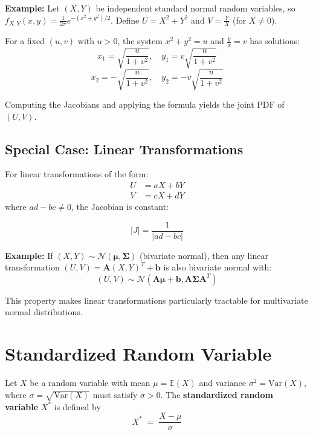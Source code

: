 \documentclass[twoside]{book}
\begin{document}
\vspace{2mm}

\textbf{Example:} Let $(X,Y)$ be independent standard normal random variables, so $f_{X,Y}(x,y) = \frac{1}{2\pi}e^{-(x^2+y^2)/2}$. Define $U = X^2 + Y^2$ and $V = \frac{Y}{X}$ (for $X \neq 0$).

For a fixed $(u,v)$ with $u > 0$, the system $x^2 + y^2 = u$ and $\frac{y}{x} = v$ has solutions:
\[
x_1 = \sqrt{\frac{u}{1+v^2}}, \quad y_1 = v\sqrt{\frac{u}{1+v^2}}
\]
\[
x_2 = -\sqrt{\frac{u}{1+v^2}}, \quad y_2 = -v\sqrt{\frac{u}{1+v^2}}
\]

Computing the Jacobians and applying the formula yields the joint PDF of $(U,V)$.

\subsection{Special Case: Linear Transformations}

For linear transformations of the form:
\begin{align}
U &= aX + bY \\
V &= cX + dY
\end{align}
where $ad - bc \neq 0$, the Jacobian is constant:

\begin{textbox}
\[
|J| = \frac{1}{|ad - bc|}
\]
\end{textbox}

\vspace{2mm}

\textbf{Example:} If $(X,Y) \sim \mathcal{N}(\boldsymbol{\mu}, \boldsymbol{\Sigma})$ (bivariate normal), then any linear transformation $(U,V) = \mathbf{A}(X,Y)^T + \mathbf{b}$ is also bivariate normal with:
\[
(U,V) \sim \mathcal{N}(\mathbf{A}\boldsymbol{\mu} + \mathbf{b}, \mathbf{A}\boldsymbol{\Sigma}\mathbf{A}^T)
\]

This property makes linear transformations particularly tractable for multivariate normal distributions.


\section{Standardized Random Variable}

Let \(X\) be a random variable with mean \(\mu = \mathbb{E}(X)\) and variance \(\sigma^2 = \mathrm{Var}(X)\), where $\sigma = \sqrt{\mathrm{Var}(X)}$ must satisfy \(\sigma > 0\). The \textbf{standardized random variable} \(X^*\) is defined by
\[
  X^* \;=\; \frac{X - \mu}{\sigma}
\]
\end{document}
